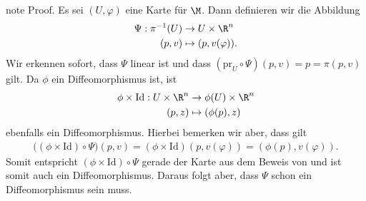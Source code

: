 \documentclass[letterpaper,10pt,german]{jupyterBook}
\begin{document}
\begin{sphinxadmonition}{note}
\sphinxAtStartPar
Proof. Es sei \((U,\varphi)\) eine Karte für \(\M\).
Dann definieren wir die Abbildung
\begin{equation*}
\begin{split}\Psi: \pi^{-1}(U) &\to U\times \R^n\\
(p,v) &\mapsto (p, v(\varphi)).\end{split}
\end{equation*}
\sphinxAtStartPar
Wir erkennen sofort, dass \(\Psi\) linear ist und dass \((\text{pr}_U\circ\Psi)(p,v) = p = \pi(p,v)\) gilt.
Da \(\phi\) ein Diffeomorphismus ist, ist
\begin{equation*}
\begin{split}\phi\times\text{Id}:U\times \R^n &\to \phi(U)\times\R^n\\
(p,z) &\mapsto (\phi(p), z)\end{split}
\end{equation*}
\sphinxAtStartPar
ebenfalls ein Diffeomorphismus.
Hierbei bemerken wir aber, dass gilt
\begin{equation*}
\begin{split}\big((\phi\times\text{Id})\circ \Psi\big)(p,v) = (\phi\times\text{Id})(p, v(\varphi)) = (\phi(p), v(\varphi)).\end{split}
\end{equation*}
\sphinxAtStartPar
Somit entspricht \((\phi\times\text{Id})\circ \Psi\) gerade der Karte aus dem Beweis von {\hyperref[\detokenize{manifolds/tangential:lem:tanman}]{}} und ist somit auch ein Diffeomorphismus.
Daraus folgt aber, dass \(\Psi\) schon ein Diffeomorphismus sein muss.
\end{sphinxadmonition}
\end{document}
